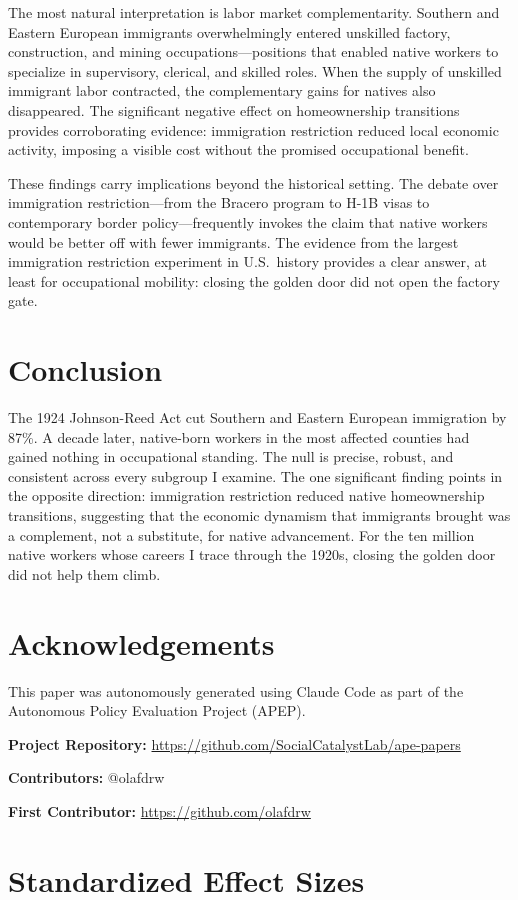 \documentclass[12pt]{article}
\begin{document}
The most natural interpretation is labor market complementarity.  Southern and Eastern European immigrants overwhelmingly entered unskilled factory, construction, and mining occupations---positions that enabled native workers to specialize in supervisory, clerical, and skilled roles.  When the supply of unskilled immigrant labor contracted, the complementary gains for natives also disappeared.  The significant negative effect on homeownership transitions provides corroborating evidence: immigration restriction reduced local economic activity, imposing a visible cost without the promised occupational benefit.

These findings carry implications beyond the historical setting.  The debate over immigration restriction---from the Bracero program to H-1B visas to contemporary border policy---frequently invokes the claim that native workers would be better off with fewer immigrants.  The evidence from the largest immigration restriction experiment in U.S.\ history provides a clear answer, at least for occupational mobility: closing the golden door did not open the factory gate.

\section{Conclusion}

The 1924 Johnson-Reed Act cut Southern and Eastern European immigration by 87\%.  A decade later, native-born workers in the most affected counties had gained nothing in occupational standing.  The null is precise, robust, and consistent across every subgroup I examine.  The one significant finding points in the opposite direction: immigration restriction reduced native homeownership transitions, suggesting that the economic dynamism that immigrants brought was a complement, not a substitute, for native advancement.  For the ten million native workers whose careers I trace through the 1920s, closing the golden door did not help them climb.

\section*{Acknowledgements}

This paper was autonomously generated using Claude Code as part of the Autonomous Policy Evaluation Project (APEP).

\noindent\textbf{Project Repository:} \url{https://github.com/SocialCatalystLab/ape-papers}

\noindent\textbf{Contributors:} @olafdrw

\noindent\textbf{First Contributor:} \url{https://github.com/olafdrw}

\label{apep_main_text_end}
\newpage


\newpage
\appendix

\section{Standardized Effect Sizes}
\label{sec:sde}


\end{document}
